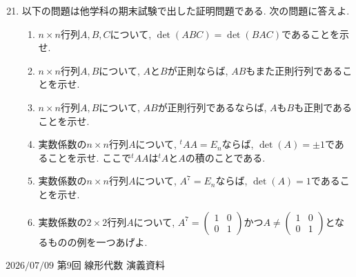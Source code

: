 \documentclass[dvipdfmx,a4paper,11pt]{article} %
\theoremstyle{definition}
\begin{document}
 \begin{enumerate}[label=\textbf{問題}\arabic*.]
 \setcounter{enumi}{20}
 \item 以下の問題は他学科の期末試験で出した証明問題である. 
 次の問題に答えよ. 
 \begin{enumerate}[label=(\arabic*)]
 \setlength{\parskip}{0cm} %
  \setlength{\itemsep}{0cm}
   \item $n\times n$行列$A, B, C$について, $\det(ABC) = \det(BAC)$であることを示せ.
    \item  $n\times n$行列$A, B$について, $A$と$B$が正則ならば, $AB$もまた正則行列であることを示せ. 
    \item $n\times n$行列$A, B$について, $AB$が正則行列であるならば, $A$も$B$も正則であることを示せ. 
 \item  実数係数の$n\times n$行列$A$について, $^{t}A A=E_n$ならば, $\det (A) = \pm 1$であることを示せ.  ここで$^{t}A A$は$^{t}A $と$A$の積のことである. 
     \item  実数係数の$n\times n$行列$A$について, $A^7=E_n$ならば, $\det (A) = 1$であることを示せ. 
    \item  実数係数の$2\times 2$行列$A$について, $A^7=\begin{pmatrix}  1&  0 \\  0 &1 \end{pmatrix}$かつ$A \neq \begin{pmatrix}  1&  0 \\  0 &1 \end{pmatrix}$となるものの例を一つあげよ. 
 \end{enumerate} 

 \end{enumerate}

 \newpage
 $\boxed{\text{2026/07/09 第9回 線形代数 演義資料}}$
 
 
 
\end{document}

